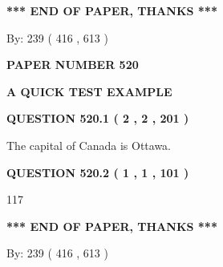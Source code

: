 \documentclass[12pt]{article}
\begin{document}
\vspace{1.0in} 
{\textbf{\large{ *** END OF PAPER, THANKS *** }}} 
   
   
\hspace{1.0in} By: 
 239 ( 416 ,  613 )
   
   
   
   
\newpage 
\setcounter{page}{ 
   520001 } 
   
   
   
   
 {\textbf{ \Large{ PAPER NUMBER  520  }}}
   
   
\vspace{0.2in}
   
   
   
   
   
   
 \vspace{0.2in}
{\LARGE {\textbf{ A QUICK TEST EXAMPLE}}}
   
   
  
\vspace{0.2in}
  
{\textbf{\Large{QUESTION
520.1 
 ( 2 , 2 , 201 )
}}}
  
  
 
 
\noindent{}
 
 
The capital of Canada is Ottawa.
 
 
 
 
  
\vspace{0.2in}
  
{\textbf{\Large{QUESTION
520.2 
 ( 1 , 1 , 101 )
}}}
  
  
 
 
\noindent{}

117
 
 
   
   
 \vspace{0.2in}
 
   
   
   
   
\vspace{1.0in} 
{\textbf{\large{ *** END OF PAPER, THANKS *** }}} 
   
   
\hspace{1.0in} By: 
 239 ( 416 ,  613 )
   
\end{document}
